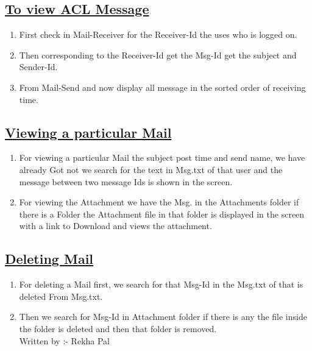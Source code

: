 \documentclass{article}
\begin{document}
\subsection*{\underline{To view ACL Message}}
	\begin{enumerate}
        \item First check in Mail-Receiver for the Receiver-Id the uses who is logged on.
	\item Then corresponding to the Receiver-Id get the Msg-Id get the subject and Sender-Id.
	\item From Mail-Send and now display all message in the sorted order of receiving time.
	\end{enumerate}
\subsection*{\underline{Viewing a particular Mail}}
	\begin{enumerate}
	\item For viewing a particular Mail the subject post time and send name, we have already
      Got not we search for the text in Msg.txt of that user and the message between two    
      message Ids is shown in the screen.
	\item For viewing the Attachment we have the Msg. in the Attachments folder if there is a     
      Folder the Attachment file in that folder is displayed in the screen with a link to    
      Download and views the attachment.
	\end{enumerate}
\subsection*{\underline{Deleting Mail}}
	\begin{enumerate}
	\item For deleting a Mail first, we search for that Msg-Id in the Msg.txt of that is deleted   
	      From Msg.txt.
	\item Then we search for Msg-Id in Attachment folder if there is any the file inside the folder   
	      is deleted and then that folder is removed. \\

                                                     Written by :- Rekha Pal
\end{enumerate}
 
\end{document}
